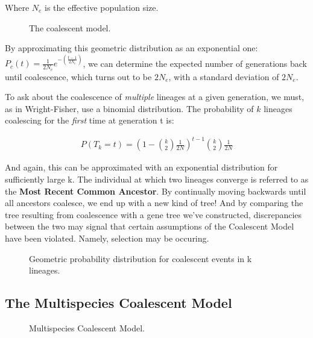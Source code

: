 Where $N_e$ is the effective population size.

\begin{figure} [ht!] 
  \centering 
  \caption{The coalescent model.}
  \label{Fig15_CoalescentModel}
\end{figure}

By approximating this geometric distribution as an exponential one: $ P_c(t) = \frac{1}{2N_e}e^{- \left( \frac{t-1}{2N_e} \right)}$, we can determine the expected number of generations back until coalescence, which turns out to be $2N_e$, with a standard deviation of $2N_e$.

To ask about the coalescence of \textit{multiple} lineages at a given generation, we must, as in Wright-Fisher, use a binomial distribution. The probability of $k$ lineages coalescing for the \textit{first} time at generation t is:

\begin{align}
  P(T_k = t) = \left( 1 - \binom{k}{2} \frac{1}{2N} \right)^{t-1} \binom{k}{2} \frac{1}{2N}
\end{align}
 
And again, this can be approximated with an exponential distribution for sufficiently large k. The individual at which two lineages converge is referred to as the \textbf{Most Recent Common Ancestor}. By continually moving backwards until all ancestors coalesce, we end up with a new kind of tree! And by comparing the tree resulting from coalescence with a gene tree we've constructed, discrepancies between the two may signal that certain assumptions of the Coalescent Model have been violated. Namely, selection may be occuring.

\begin{figure} [ht!] 
  \centering 
  \caption{Geometric probability distribution for coalescent events in k lineages.}
  \label{Fig16_CoalescentProbDist}
\end{figure} 

\pagebreak
\subsection{The Multispecies Coalescent Model}

\begin{figure} [ht!] 
  \centering 
  \caption{Multispecies Coalescent Model.}
  \label{Fig17_MultispeciesCoalescent}
\end{figure}

